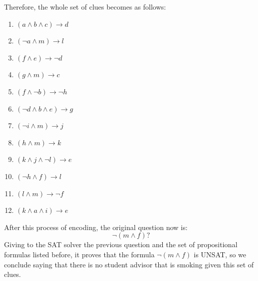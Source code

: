 \begin{example}
    Therefore, the whole set of clues becomes as follows:
    \begin{enumerate}
        \item $(a \wedge b \wedge c) \to d$
        \item $(\neg a \wedge m) \to l$
        \item $(f \wedge e) \to \neg d$
        \item $(g \wedge m) \to c$
        \item $(f \wedge \neg b) \to \neg h$
        \item $(\neg d \wedge b \wedge e) \to g$
        \item $(\neg i \wedge m) \to j$
        \item $(h \wedge m) \to k$
        \item $(k \wedge j \wedge \neg l) \to e$
        \item $(\neg h \wedge f) \to l$
        \item $(l \wedge m) \to \neg f$
        \item $(k \wedge a \wedge i) \to e$
    \end{enumerate} \vspace{7pt}

    After this process of encoding, the original question now is:
    $$ \neg (m \wedge f)? $$
    Giving to the SAT solver the previous question and the set of propositional formulas listed before, it proves that the formula $\neg (m \wedge f)$ is UNSAT,
    so we conclude saying that there is no student advisor that is smoking given this set of clues.
\end{example}